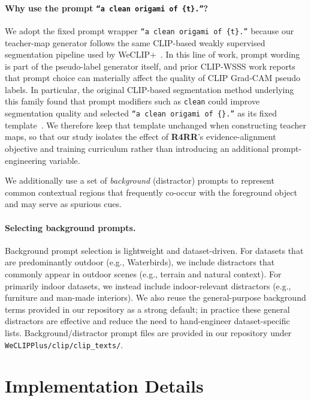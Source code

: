 \documentclass[10pt,twocolumn,letterpaper]{article}
\begin{document}
\paragraph{Why use the prompt \texttt{``a clean origami of \{t\}.''}?}
We adopt the fixed prompt wrapper \texttt{``a clean origami of \{t\}.''} because our teacher-map generator follows the same CLIP-based weakly supervised segmentation pipeline used by WeCLIP+~\cite{zhang2024frozen}. In this line of work, prompt wording is part of the pseudo-label generator itself, and prior CLIP-WSSS work reports that prompt choice can materially affect the quality of CLIP Grad-CAM pseudo labels. In particular, the original CLIP-based segmentation method underlying this family found that prompt modifiers such as \texttt{clean} could improve segmentation quality and selected \texttt{``a clean origami of \{\}.''} as its fixed template~\cite{lin2023clip}. We therefore keep that template unchanged when constructing teacher maps, so that our study isolates the effect of \textbf{R4RR}'s evidence-alignment objective and training curriculum rather than introducing an additional prompt-engineering variable.

We additionally use a set of \emph{background} (distractor) prompts to represent common contextual regions that frequently co-occur with the foreground object and may serve as spurious cues.


\paragraph{Selecting background prompts.}
Background prompt selection is lightweight and dataset-driven. For datasets that are predominantly outdoor (e.g., Waterbirds), we include distractors that commonly appear in outdoor scenes (e.g., terrain and natural context). For primarily indoor datasets, we instead include indoor-relevant distractors (e.g., furniture and man-made interiors). We also reuse the general-purpose background terms provided in our repository as a strong default; in practice these general distractors are effective and reduce the need to hand-engineer dataset-specific lists. Background/distractor prompt files are provided in our repository under \texttt{WeCLIPPlus/clip/clip\_texts/}.


\section{Implementation Details}
\label{appendix:implementation_details}
\end{document}
